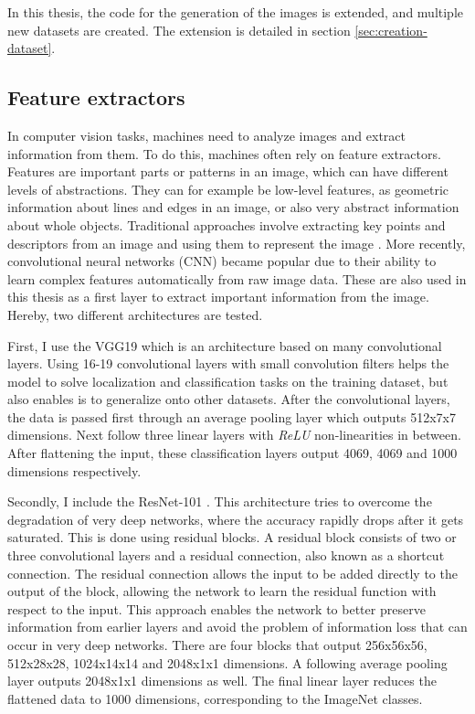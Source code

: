 In this thesis, the code for the generation of the images is extended, and multiple new datasets are created.
The extension is detailed in section \ref{sec:creation-dataset}.


\subsection{Feature extractors}
In computer vision tasks, machines need to analyze images and extract information from them.
To do this, machines often rely on feature extractors.
Features are important parts or patterns in an image, which can have different levels of abstractions.
They can for example be low-level features, as geometric information about lines and edges in an image, or also very abstract information about whole objects.
Traditional approaches involve extracting key points and descriptors from an image and using them to represent the image \citep{Harris1988,Lowe1999,Bay2006}.
More recently, convolutional neural networks (CNN) became popular due to their ability to learn complex features automatically from raw image data.
These are also used in this thesis as a first layer to extract important information from the image. Hereby, two different architectures are tested.

First, I use the VGG19 \citep{Simonyan2015} which is an architecture based on many convolutional layers.
Using 16-19 convolutional layers with small convolution filters helps the model to solve localization and classification tasks on the training dataset, but also enables is to generalize onto other datasets.
After the convolutional layers, the data is passed first through an average pooling layer which outputs 512x7x7 dimensions.
Next follow three linear layers with \emph{ReLU} non-linearities in between.
After flattening the input, these classification layers output 4069, 4069 and 1000 dimensions respectively.

Secondly, I include the ResNet-101 \citep{He2016}.
This architecture tries to overcome the degradation of very deep networks, where the accuracy rapidly drops after it gets saturated.
This is done using residual blocks.
A residual block consists of two or three convolutional layers and a residual connection, also known as a shortcut connection.
The residual connection allows the input to be added directly to the output of the block, allowing the network to learn the residual function with respect to the input.
This approach enables the network to better preserve information from earlier layers and avoid the problem of information loss that can occur in very deep networks.
There are four blocks that output 256x56x56, 512x28x28, 1024x14x14 and 2048x1x1 dimensions.
A following average pooling layer outputs 2048x1x1 dimensions as well.
The final linear layer reduces the flattened data to 1000 dimensions, corresponding to the ImageNet classes.

